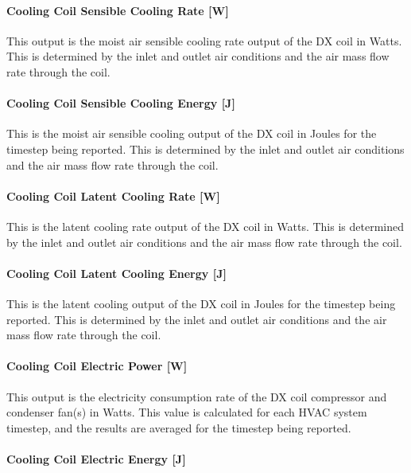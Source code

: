 \paragraph{Cooling Coil Sensible Cooling Rate {[}W{]}}

This output is the moist air sensible cooling rate output of the DX coil in Watts. This is determined by the inlet and outlet air conditions and the air mass flow rate through the coil.

\paragraph{Cooling Coil Sensible Cooling Energy {[}J{]}}

This is the moist air sensible cooling output of the DX coil in Joules for the timestep being reported. This is determined by the inlet and outlet air conditions and the air mass flow rate through the coil.

\paragraph{Cooling Coil Latent Cooling Rate {[}W{]}}

This is the latent cooling rate output of the DX coil in Watts. This is determined by the inlet and outlet air conditions and the air mass flow rate through the coil.

\paragraph{Cooling Coil Latent Cooling Energy {[}J{]}}

This is the latent cooling output of the DX coil in Joules for the timestep being reported. This is determined by the inlet and outlet air conditions and the air mass flow rate through the coil.

\paragraph{Cooling Coil Electric Power {[}W{]}}

This output is the electricity consumption rate of the DX coil compressor and condenser fan(s) in Watts. This value is calculated for each HVAC system timestep, and the results are averaged for the timestep being reported.

\paragraph{Cooling Coil Electric Energy {[}J{]}}

